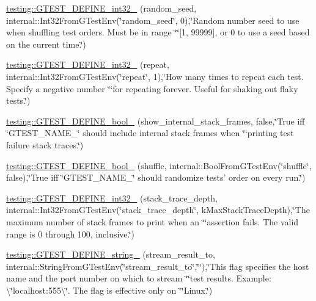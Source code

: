 \begin{DoxyCompactItemize}
\item 
\hyperlink{namespacetesting_a25e098abb7ce93d06582d48434be90c7}{testing\-::\-G\-T\-E\-S\-T\-\_\-\-D\-E\-F\-I\-N\-E\-\_\-int32\-\_\-} (random\-\_\-seed, internal\-::\-Int32\-From\-G\-Test\-Env(\char`\"{}random\-\_\-seed\char`\"{}, 0),\char`\"{}Random number seed to use when shuffling test orders.  Must be in range \char`\"{}\char`\"{}\mbox{[}1, 99999\mbox{]}, or 0 to use a seed based on the current time.\char`\"{})
\item 
\hyperlink{namespacetesting_a8b2c1dad0764e0984486bae49a988f0e}{testing\-::\-G\-T\-E\-S\-T\-\_\-\-D\-E\-F\-I\-N\-E\-\_\-int32\-\_\-} (repeat, internal\-::\-Int32\-From\-G\-Test\-Env(\char`\"{}repeat\char`\"{}, 1),\char`\"{}How many times to repeat each test.  Specify a negative number \char`\"{}\char`\"{}for repeating forever.  Useful for shaking out flaky tests.\char`\"{})
\item 
\hyperlink{namespacetesting_a5982e64522de6804cbf5d1732fd62751}{testing\-::\-G\-T\-E\-S\-T\-\_\-\-D\-E\-F\-I\-N\-E\-\_\-bool\-\_\-} (show\-\_\-internal\-\_\-stack\-\_\-frames, false,\char`\"{}True iff \char`\"{}G\-T\-E\-S\-T\-\_\-\-N\-A\-M\-E\-\_\-\char`\"{} should include internal stack frames when \char`\"{}\char`\"{}printing test failure stack traces.\char`\"{})
\item 
\hyperlink{namespacetesting_acc11444cd1c18500658a35e02d4f2cf9}{testing\-::\-G\-T\-E\-S\-T\-\_\-\-D\-E\-F\-I\-N\-E\-\_\-bool\-\_\-} (shuffle, internal\-::\-Bool\-From\-G\-Test\-Env(\char`\"{}shuffle\char`\"{}, false),\char`\"{}True iff \char`\"{}G\-T\-E\-S\-T\-\_\-\-N\-A\-M\-E\-\_\-\char`\"{} should randomize tests' order on every run.\char`\"{})
\item 
\hyperlink{namespacetesting_aaedd7015b957f3c37662c289b645e7d9}{testing\-::\-G\-T\-E\-S\-T\-\_\-\-D\-E\-F\-I\-N\-E\-\_\-int32\-\_\-} (stack\-\_\-trace\-\_\-depth, internal\-::\-Int32\-From\-G\-Test\-Env(\char`\"{}stack\-\_\-trace\-\_\-depth\char`\"{}, k\-Max\-Stack\-Trace\-Depth),\char`\"{}The maximum number of stack frames to print when an \char`\"{}\char`\"{}assertion fails.  The valid range is 0 through 100, inclusive.\char`\"{})
\item 
\hyperlink{namespacetesting_a0422a6f971513cf559a8575a0533b235}{testing\-::\-G\-T\-E\-S\-T\-\_\-\-D\-E\-F\-I\-N\-E\-\_\-string\-\_\-} (stream\-\_\-result\-\_\-to, internal\-::\-String\-From\-G\-Test\-Env(\char`\"{}stream\-\_\-result\-\_\-to\char`\"{},\char`\"{}\char`\"{}),\char`\"{}This flag specifies the host name and the port number on which to stream \char`\"{}\char`\"{}test results. Example\-: \textbackslash{}\char`\"{}localhost\-:555\textbackslash{}\char`\"{}. The flag is effective only on \char`\"{}\char`\"{}Linux.\char`\"{})

\end{DoxyCompactItemize}
